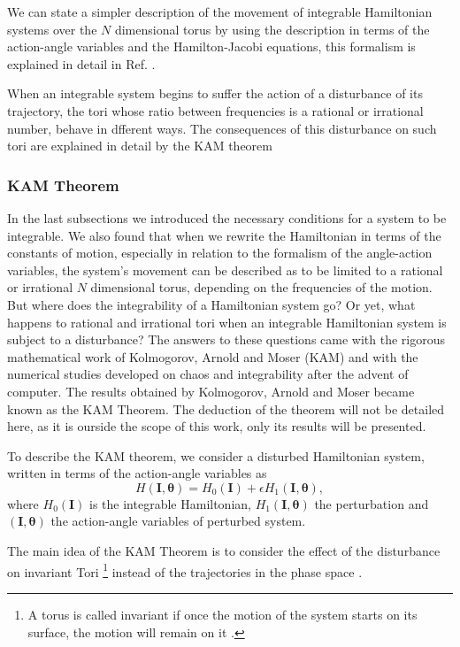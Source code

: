 We can state a simpler description of the movement of integrable Hamiltonian systems over the $N$ dimensional torus by using the description in terms of the action-angle variables and the Hamilton-Jacobi equations, this formalism is explained in detail in Ref. \cite{goldstein2002classical}. 

When an integrable system begins to suffer the action of a disturbance of its trajectory, the tori whose ratio between frequencies is a rational or irrational number, behave in dfferent ways. The consequences of this disturbance on such tori are explained in detail by the KAM theorem


\subsubsection{KAM Theorem}
In the last subsections we introduced the necessary conditions for a system to be integrable. We also found that when we rewrite the Hamiltonian in terms of the constants of motion, especially in relation to the formalism of the angle-action variables, the system's movement can be described as to be limited to a rational or irrational $N$ dimensional torus, depending on the frequencies of the motion. But where does the integrability of a Hamiltonian system go? Or yet, what happens to rational and irrational tori when an integrable Hamiltonian system is subject to a disturbance? The answers to these questions came with the rigorous mathematical work of Kolmogorov, Arnold and Moser (KAM) and with the numerical studies developed on chaos and integrability after the advent of computer. The results obtained by Kolmogorov, Arnold and Moser became known as the KAM Theorem. The deduction of the theorem will not be detailed here, as it is ourside the scope of this work, only its results will be presented.\par

To describe the KAM theorem, we consider a disturbed Hamiltonian system, written in terms of the action-angle variables as
\begin{equation}
H(\bm{I},\bm{\theta})=H_0(\bm{I})+\epsilon H_1(\bm{I},\bm{\theta}),
\end{equation}
where $H_0(\bm{I})$ is the integrable Hamiltonian, $H_1(\bm{I},\bm{\theta})$ the perturbation and $(\bm{I},\bm{\theta})$ the action-angle variables of perturbed system.\par

The main idea of the KAM Theorem is to consider the effect of the disturbance on invariant Tori \footnote{A torus is called invariant if once the motion of the system starts on its surface, the motion will remain on it \cite{ott_chaos_2002}.} instead of the trajectories in the phase space \cite{zaslavsky2005hamiltonian}.



